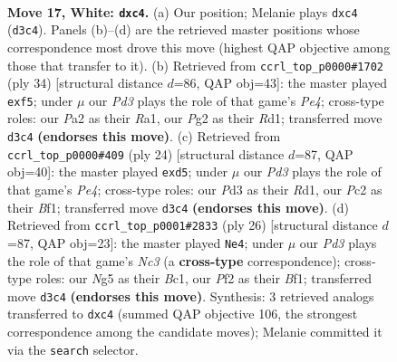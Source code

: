 \documentclass[11pt]{article}
\begin{document}
\clearpage

\begin{figure}[p]\centering
\begin{subfigure}{0.46\textwidth}\centering
\resizebox{\linewidth}{!}{%
\newchessgame
\chessboard[
  setfen={rnbqk2r/4b3/p2p4/1p1PppN1/2p3p1/1B1P4/PPPQ1PP1/R1B1RK2 w kq - 0 17},
  showmover=false,
  pgfstyle=straightmove, color=movearrow, markmove={d3-c4}
]}
\caption{}
\end{subfigure}\hfill
\begin{subfigure}{0.46\textwidth}\centering
\resizebox{\linewidth}{!}{%
\newchessgame
\chessboard[
  setfen={r1bqk2r/4p1bp/1p1p2p1/2n2p2/1pP1P3/3B1N1P/PPQ2PP1/R1BR2K1 w kq - 0 18},
  showmover=false,
  pgfstyle=straightmove, color=movearrow, markmove={e4-f5}
]}
\caption{}
\end{subfigure}
\\[4pt]
\begin{subfigure}{0.46\textwidth}\centering
\resizebox{\linewidth}{!}{%
\newchessgame
\chessboard[
  setfen={rnbqk2r/4bpp1/p2p3p/3np3/1p2P3/1N2BQ1P/PPP2PP1/2KR1B1R w kq - 0 13},
  showmover=false,
  pgfstyle=straightmove, color=movearrow, markmove={e4-d5}
]}
\caption{}
\end{subfigure}\hfill
\begin{subfigure}{0.46\textwidth}\centering
\resizebox{\linewidth}{!}{%
\newchessgame
\chessboard[
  setfen={r1bqk1nr/1p3pb1/2p3p1/p3p1Pp/P1P5/1RNP3P/1P3P2/2BQKB1R w Kkq - 0 14},
  showmover=false,
  pgfstyle=straightmove, color=movearrow, markmove={c3-e4}
]}
\caption{}
\end{subfigure}
\caption{\textbf{Move 17, White: \texttt{dxc4}.} (a) Our position; Melanie plays \texttt{dxc4} (\texttt{d3c4}). Panels (b)--(d) are the retrieved master positions whose correspondence most drove this move (highest QAP objective among those that transfer to it). (b) Retrieved from \texttt{ccrl\_top\_p0000\#1702} (ply 34) [structural distance $d$=86, QAP obj=43]: the master played \texttt{exf5}; under $\mu$ our \emph{Pd3} plays the role of that game's \emph{Pe4}; cross-type roles: our \emph{P}a2 as their \emph{R}a1, our \emph{P}g2 as their \emph{R}d1; transferred move \texttt{d3c4} \textbf{(endorses this move)}. (c) Retrieved from \texttt{ccrl\_top\_p0000\#409} (ply 24) [structural distance $d$=87, QAP obj=40]: the master played \texttt{exd5}; under $\mu$ our \emph{Pd3} plays the role of that game's \emph{Pe4}; cross-type roles: our \emph{P}d3 as their \emph{R}d1, our \emph{P}c2 as their \emph{B}f1; transferred move \texttt{d3c4} \textbf{(endorses this move)}. (d) Retrieved from \texttt{ccrl\_top\_p0001\#2833} (ply 26) [structural distance $d$=87, QAP obj=23]: the master played \texttt{Ne4}; under $\mu$ our \emph{Pd3} plays the role of that game's \emph{Nc3} (a \textbf{cross-type} correspondence); cross-type roles: our \emph{N}g5 as their \emph{B}c1, our \emph{P}f2 as their \emph{B}f1; transferred move \texttt{d3c4} \textbf{(endorses this move)}. Synthesis: 3 retrieved analogs transferred to \texttt{dxc4} (summed QAP objective 106, the strongest correspondence among the candidate moves); Melanie committed it via the \texttt{search} selector.}
\label{fig:thought-m32}
\end{figure}
\end{document}
